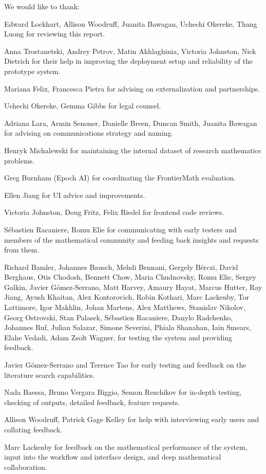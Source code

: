 \documentclass[11pt, a4paper, copyright, gdm]{google}
\begin{document}
We would like to thank:

Edward Lockhart, Allison Woodruff, Juanita Bawagan, Uchechi Okereke, Thang Luong for reviewing this report.

Anna Trostanetski, Andrey Petrov, Matin Akhlaghinia, Victoria Johnston, Nick Dietrich for their help in improving the deployment setup and reliability of the prototype system.

Mariana Felix, Francesca Pietra for advising on externalization and partnerships.

Uchechi Okereke, Gemma Gibbs for legal counsel. 

Adriana Lara, Armin Senoner, Danielle Breen, Duncan Smith, Juanita Bawagan for advising on communications strategy and naming.

Henryk Michalewski for maintaining the internal dataset of research mathematics problems.

Greg Burnham (Epoch AI) for coordinating the FrontierMath evaluation.

Ellen Jiang for UI advice and improvements.

Victoria Johnston, Doug Fritz, Felix Riedel for frontend code reviews. 

Sébastien Racaniere, Romu Elie for communicating with early testers and members of the mathematical community and feeding back insights and requests from them.

Richard Bamler, Johannes Bausch, Mehdi Bennani, Gergely Bérczi, David Berghaus, Otis Chodosh, Bennett Chow, Maria Chudnovsky, Romu Elie, Sergey Galkin, Javier Gómez-Serrano, Matt Harvey, Amaury Hayat, Marcus Hutter, Ray Jiang, Ayush Khaitan, Alex Kontorovich, Robin Kothari, Marc Lackenby, Tor Lattimore, Igor Makhlin, Johan Martens, Alex Matthews, Stanislav Nikolov, Georg Ostrovski, Stan Palasek, Sébastien Racaniere, Danylo Radchenko, Johannes Ruf, Julian Salazar, Simone Severini, Phiala Shanahan, Iain Smears, Elahe Vedadi, Adam Zsolt Wagner, for testing the system and providing feedback.

Javier Gómez-Serrano and Terence Tao for early testing and feedback on the literature search capabilities.

Nada Baessa, Bruno Vergara Biggio, Semon Rezchikov for in-depth testing, checking of outputs, detailed feedback, feature requests.

Allison Woodruff, Patrick Gage Kelley for help with interviewing early users and collating feedback.

Marc Lackenby for feedback on the mathematical performance of the system, input into the workflow and interface design, and deep mathematical collaboration.
\end{document}
